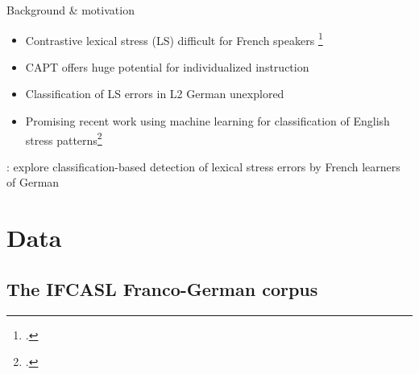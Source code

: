 \documentclass[xcolor={dvipsnames}]{beamer}
\begin{document}
\begin{frame}{Background \& motivation}%
\begin{itemize}
\item{Contrastive lexical stress (LS) difficult for French speakers%
\footcite{Dupoux1997}
}
\item{CAPT offers huge potential for individualized instruction}
\vfill
\item{Classification of LS errors in L2 German unexplored}
\item{Promising recent work using machine learning for classification of English stress patterns\footcite{Kim2011,Shahin2012a}
}
\end{itemize}
\vfill
{}: explore classification-based detection of lexical stress errors by French learners of German
\end{frame}


\section{Data}
\subsection{The IFCASL Franco-German corpus}
\end{document}

